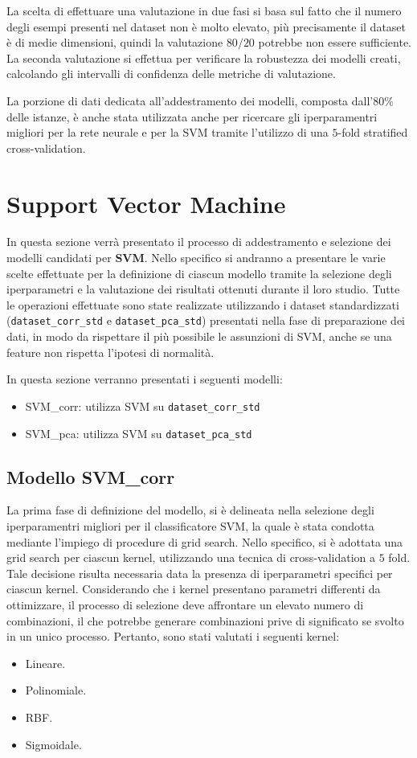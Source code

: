 La scelta di effettuare una valutazione in due fasi si basa sul fatto che il
numero degli esempi presenti nel dataset non è molto elevato, più precisamente
il dataset è di medie dimensioni, quindi la valutazione $80/20$ potrebbe non
essere sufficiente. La seconda valutazione si effettua per verificare la
robustezza dei modelli creati, calcolando gli intervalli di confidenza delle
metriche di valutazione.

La porzione di dati dedicata all'addestramento dei modelli, composta dall'$80\%$
delle istanze, è anche stata utilizzata anche per ricercare gli iperparamentri
migliori per la rete neurale e per la SVM tramite l'utilizzo di una $5$-fold 
stratified cross-validation.
\section{Support Vector Machine}
In questa sezione verrà presentato il processo di addestramento e selezione dei
modelli candidati per \textbf{SVM}. Nello specifico si andranno a presentare le
varie scelte effettuate per la definizione di ciascun modello tramite la selezione
degli iperparametri e la valutazione dei risultati ottenuti durante il loro studio.
Tutte le operazioni effettuate sono state realizzate utilizzando i dataset standardizzati
(\texttt{dataset\_corr\_std} e \texttt{dataset\_pca\_std}) presentati nella fase
di preparazione dei dati, in modo da rispettare il più possibile le assunzioni
di SVM, anche se una feature non rispetta l'ipotesi di normalità.

In questa sezione verranno presentati i seguenti modelli:
\begin{itemize}
    \item SVM\_corr: utilizza SVM su \texttt{dataset\_corr\_std}
    \item SVM\_pca: utilizza SVM su \texttt{dataset\_pca\_std}
\end{itemize}

\subsection{Modello SVM\_corr}
La prima fase di definizione del modello, si è delineata nella selezione degli
iperparamentri migliori per il classificatore SVM, la quale è stata
condotta mediante l'impiego di procedure di grid search. Nello specifico, si è
adottata una grid search per ciascun kernel, utilizzando una tecnica di
cross-validation a $5$ fold. Tale decisione risulta necessaria data la presenza
di iperparametri specifici per ciascun kernel. Considerando che i
kernel presentano parametri differenti da ottimizzare, il processo di selezione
deve affrontare un elevato numero di combinazioni, il che potrebbe generare
combinazioni prive di significato se svolto in un unico processo. Pertanto, sono
stati valutati i seguenti kernel:
\begin{itemize}
    \item Lineare.
    \item Polinomiale.
    \item RBF.
    \item Sigmoidale.
\end{itemize}

